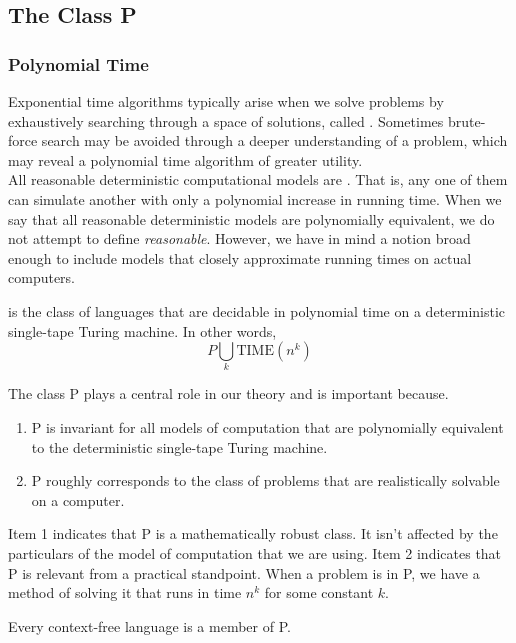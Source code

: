 \documentclass{article}
\begin{document}
\subsection{The Class P}

\subsubsection{Polynomial Time}

Exponential time algorithms typically arise when we solve problems by exhaustively searching through a space of solutions, called . Sometimes brute-force search may be avoided through a deeper understanding of a problem, which may reveal a polynomial time algorithm of greater utility. \\ 

All reasonable deterministic computational models are . That is, any one of them can simulate another with only a polynomial increase in running time. When we say that all reasonable deterministic models are polynomially equivalent, we do not attempt to define \emph{reasonable}. However, we have in mind a notion broad enough to include models that closely approximate running times on actual computers. 

\begin{definition}
   is the class of languages that are decidable in polynomial time on a deterministic single-tape Turing machine. In other words, $$P \bigcup_{k} \textrm{TIME}(n^k)$$
\end{definition}

The class P plays a central role in our theory and is important because. 
\begin{enumerate}
  \item P is invariant for all models of computation that are polynomially equivalent to the deterministic single-tape Turing machine. 
  \item P roughly corresponds to the class of problems that are realistically solvable on a computer. 
\end{enumerate}

Item 1 indicates that P is a mathematically robust class. It isn't affected by the particulars of the model of computation that we are using. Item 2 indicates that P is relevant from a practical standpoint. When a problem is in P, we have a method of solving it that runs in time $n^k$ for some constant $k$. 

\begin{theorem}
  Every context-free language is a member of P.
\end{theorem}
\end{document}
